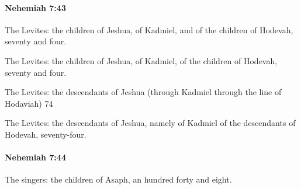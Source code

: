 		\paragraph{Nehemiah 7:43} %
			\label{NEHEMIAH-7-43}

			The Levites: the children of Jeshua, of Kadmiel, and of the children of Hodevah, seventy and four.

			\begin{versebox}
					\item[BHS] 
					\item[LXX] 
					\item[ASV] The Levites: the children of Jeshua, of Kadmiel, of the children of Hodevah, seventy and four.
					\item[NIV] The Levites: the descendants of Jeshua (through Kadmiel through the line of Hodaviah) 74
					\item[NRSV] The Levites: the descendants of Jeshua, namely of Kadmiel of the descendants of Hodevah, seventy-four.
			\end{versebox}

		\paragraph{Nehemiah 7:44} %
			\label{NEHEMIAH-7-44}

			The singers: the children of Asaph, an hundred forty and eight.

